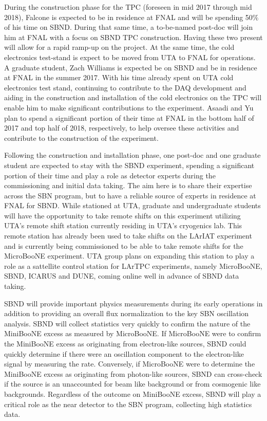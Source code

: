 During the construction phase for the TPC (foreseen in mid 2017 through mid 2018), Falcone is expected to be in residence at FNAL and will be spending 50$\%$ of his time on SBND. During that same time, a to-be-named post-doc will join him at FNAL with a focus on SBND TPC construction. Having these two present will allow for a rapid ramp-up on the project. At the same time, the cold electronics test-stand is expect to be moved from UTA to FNAL for operations. A graduate student, Zach Williams is expected be on SBND and be in residence at FNAL in the summer 2017.  With his time already spent on UTA cold electronics test stand, continuing to contribute to the DAQ development and aiding in the construction and installation of the cold electronics on the TPC will enable him to make significant contributions to the experiment.  Asaadi and Yu plan to spend a significant portion of their time at FNAL in the bottom half of 2017 and top half of 2018, respectively, to help oversee these activities and contribute to the construction of the experiment.

Following the construction and installation phase, one post-doc and one graduate student are expected to stay with the SBND experiment, spending a significant portion of their time and play a role as detector experts during the commissioning and initial data taking. The aim here is to share their expertise across the SBN program, but to have a reliable source of experts in residence at FNAL for SBND.  While stationed at UTA, graduate and undergraduate students will have the opportunity to take remote shifts on this experiment utilizing UTA's remote shift station currently residing in UTA's cryogenics lab. This remote station has already been used to take shifts on the LArIAT experiment and is currently being commissioned to be able to take remote shifts for the MicroBooNE experiment. UTA group plans on expanding this station to play a role as a sattellite control station for LArTPC experiments, namely MicroBooNE, SBND, ICARUS and DUNE, coming online well in advance of SBND data taking.  

\label{sec:SBNDDataAnalysis}
SBND will provide important physics measurements during its early operations in addition to providing an overall flux normalization to the key SBN oscillation analysis. SBND will collect statistics very quickly to confirm the nature of the MiniBooNE excess as measured by MicroBooNE. If MicroBooNE were to confirm the MiniBooNE excess as originating from electron-like sources, SBND could quickly determine if there were an oscillation component to the electron-like signal by measuring the rate.  Conversely, if MicroBooNE were to determine the MiniBooNE excess as originating from photon-like sources, SBND can cross-check if the source is an unaccounted for beam like background or from cosmogenic like backgrounds. Regardless of the outcome on MiniBooNE excess, SBND will play a critical role as the near detector to the SBN program, collecting high statistics data.

